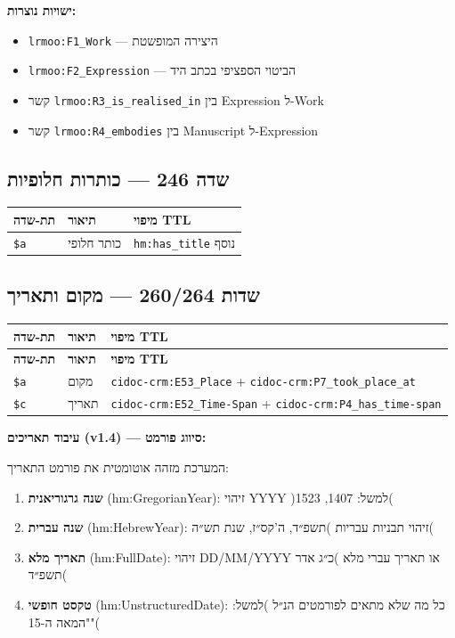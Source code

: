 \documentclass[12pt,a4paper]{article}
\newcommand{\marcfield}[1]{\texttt{#1}}
\newcommand{\ttlprop}[1]{\texttt{#1}}
\newcommand{\ttlclass}[1]{\texttt{#1}}
\begin{document}
\textbf{ישויות נוצרות:}
\begin{itemize}
\item \ttlclass{lrmoo:F1\_Work} — היצירה המופשטת
\item \ttlclass{lrmoo:F2\_Expression} — הביטוי הספציפי בכתב היד
\item קשר \ttlprop{lrmoo:R3\_is\_realised\_in} בין Expression ל-Work
\item קשר \ttlprop{lrmoo:R4\_embodies} בין Manuscript ל-Expression
\end{itemize}

\subsection{שדה 246 — כותרות חלופיות}

\begin{longtable}{|L{2.5cm}|p{4.5cm}|L{9cm}|}
\hline
\textbf{תת-שדה} & \textbf{תיאור} & \textbf{מיפוי TTL} \\
\hline
\marcfield{\$a} & כותר חלופי & \ttlprop{hm:has\_title} נוסף \\
\hline
\end{longtable}

\subsection{שדות 260/264 — מקום ותאריך}

\begin{longtable}{|L{2.5cm}|p{4.5cm}|L{9cm}|}
\hline
\textbf{תת-שדה} & \textbf{תיאור} & \textbf{מיפוי TTL} \\
\hline
\endfirsthead
\hline
\textbf{תת-שדה} & \textbf{תיאור} & \textbf{מיפוי TTL} \\
\hline
\endhead
\hline
\endfoot
\marcfield{\$a} & מקום & \ttlclass{cidoc-crm:E53\_Place} + \ttlprop{cidoc-crm:P7\_took\_place\_at} \\
\hline
\marcfield{\$c} & תאריך & \ttlclass{cidoc-crm:E52\_Time-Span} + \ttlprop{cidoc-crm:P4\_has\_time-span} \\
\hline
\end{longtable}

\textbf{עיבוד תאריכים \textenglish{(v1.4)} — סיווג פורמט:}

המערכת מזהה אוטומטית את פורמט התאריך:

\begin{enumerate}
\item \textbf{שנה גרגוריאנית} \textenglish{(hm:GregorianYear)}: זיהוי \textenglish{YYYY} )למשל: 1407, 1523(
\item \textbf{שנה עברית} \textenglish{(hm:HebrewYear)}: זיהוי תבניות עבריות )תשפ״ד, ה'קס״ז, שנת תש״ה(
\item \textbf{תאריך מלא} \textenglish{(hm:FullDate)}: זיהוי \textenglish{DD/MM/YYYY} או תאריך עברי מלא )כ״ג אדר תשפ״ד(
\item \textbf{טקסט חופשי} \textenglish{(hm:UnstructuredDate)}: כל מה שלא מתאים לפורמטים הנ״ל )למשל: "המאה ה-15"(
\end{enumerate}
\end{document}
